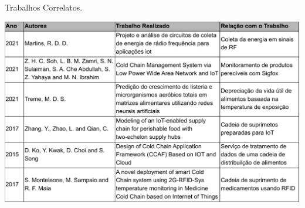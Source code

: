 \begin{quadro}
  \caption{Trabalhos Correlatos.}
  \begin{center}
      \includegraphics[scale=0.64]{img/correlatos.pdf}
  \end{center}
  \label{qd:correlatos}
\end{quadro}



